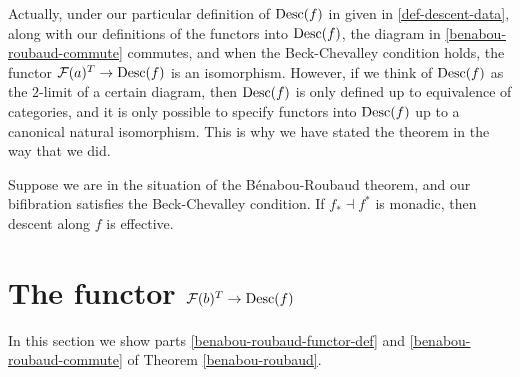 \documentclass{amsart}
\begin{document}
\begin{remark}
    Actually, under our particular definition of $\operatorname{Desc}(f)$
        in given in \ref{def-descent-data},
        along with our definitions of the functors into $\operatorname{Desc}(f)$,
        the diagram in \eqref{benabou-roubaud-commute}
        commutes, and
        when the Beck-Chevalley condition holds,
        the functor $\mathcal F(a)^T\to \operatorname{Desc}(f)$ is an isomorphism.
    However, if we think of $\operatorname{Desc}(f)$ as the $2$-limit of a certain diagram,
        then $\operatorname{Desc}(f)$ is only defined up to equivalence of categories,
        and it is only possible to specify functors into $\operatorname{Desc}(f)$
        up to a canonical natural isomorphism.
    This is why we have stated the theorem in the way that we did.
\end{remark}
\begin{corollary}
    Suppose we are in the situation of the B\'enabou-Roubaud theorem,
        and our bifibration satisfies the Beck-Chevalley condition.
    If $f_\ast \dashv f^\ast$ is monadic, then descent along $f$ is effective.
\end{corollary}
\section{The functor $\mathcal F(b)^T\to \operatorname{Desc}(f)$}
    In this section we show parts \eqref{benabou-roubaud-functor-def} and
    \eqref{benabou-roubaud-commute} of Theorem \ref{benabou-roubaud}.
\end{document}
